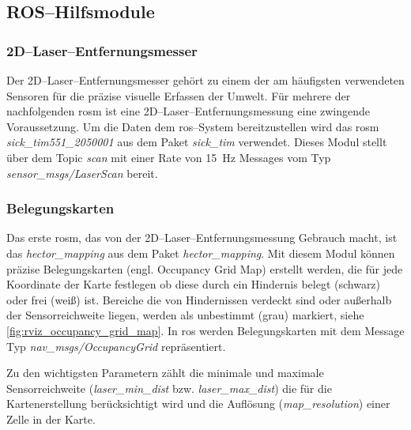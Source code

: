 \subsection{ROS--Hilfsmodule}


\begin{comment}
--------------------------------------------------------------------------------
- \url{http://wiki.ros.org/sick_tim}
\end{comment}
\subsubsection{2D--Laser--Entfernungsmesser}

Der 2D--Laser--Entfernungsmesser gehört zu einem der am häufigsten verwendeten Sensoren für die präzise visuelle Erfassen der Umwelt. Für mehrere der nachfolgenden \Gls{rosm} ist eine 2D--Laser--Entfernungsmessung eine zwingende Voraussetzung. Um die Daten dem \Gls{ros}--System bereitzustellen wird das \Gls{rosm} \textit{sick\_tim551\_2050001} aus dem Paket \textit{sick\_tim} verwendet. Dieses Modul stellt über dem Topic \textit{scan} mit einer Rate von \SI{15}{\hertz} Messages vom Typ \textit{sensor\_msgs/LaserScan} bereit.


\begin{comment}
--------------------------------------------------------------------------------
- \url{http://wiki.ros.org/hector_mapping}
\end{comment}
\subsubsection{Belegungskarten}

Das erste \Gls{rosm}, das von der 2D--Laser--Entfernungsmessung Gebrauch macht, ist das \textit{hector\_mapping} aus dem Paket \textit{hector\_mapping}. Mit diesem Modul können präzise Belegungskarten (engl. Occupancy Grid Map) erstellt werden, die für jede Koordinate der Karte festlegen ob diese durch ein Hindernis belegt (schwarz) oder frei (weiß) ist. Bereiche die von Hindernissen verdeckt sind oder außerhalb der Sensorreichweite liegen, werden als unbestimmt (grau) markiert, siehe \autoref{fig:rviz_occupancy_grid_map}. In \Gls{ros} werden Belegungskarten mit dem Message Typ \textit{nav\_msgs/OccupancyGrid} repräsentiert.

Zu den wichtigsten Parametern zählt die minimale und maximale Sensorreichweite (\textit{laser\_min\_dist} bzw. \textit{laser\_max\_dist}) die für die Kartenerstellung berücksichtigt wird und die Auflösung (\textit{map\_resolution}) einer Zelle in der Karte.

